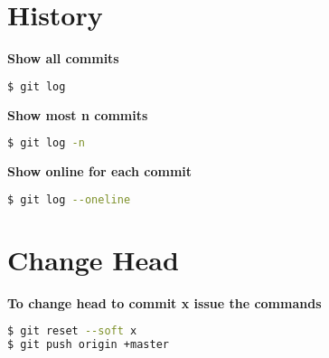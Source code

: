 \documentclass[a4paper,9pt]{extarticle}
\begin{document}
\begin{multicols*}{2}

\section{History}
\textbf{\large Show all commits}
\begin{lstlisting}[language=bash]
$ git log
\end{lstlisting}
\textbf{\large Show most n commits}
\begin{lstlisting}[language=bash]
$ git log -n
\end{lstlisting}
\textbf{\large Show online for each commit}
\begin{lstlisting}[language=bash]
$ git log --oneline 
\end{lstlisting}

\section{Change Head}
\textbf{\large To change head to commit x issue the commands }
\begin{lstlisting}[language=bash]
$ git reset --soft x
$ git push origin +master 
\end{lstlisting}


\end{multicols*}
\end{document}
